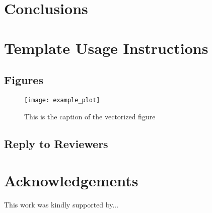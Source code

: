 \documentclass[journal]{IEEEtran}
\begin{document}
\section{Conclusions}
\label{sec_conclusions}

\section{Template Usage Instructions}
\subsection{Figures} \label{sec_figures}


\begin{figure}[t] %
     \centering
     \texttt{[image: example\_plot]}
     \caption{This is the caption of the vectorized figure}
     \label{fig_MyLabel}
  \end{figure}

\subsection{Reply to Reviewers}\label{sec_reply}


\section*{Acknowledgements}
This work was kindly supported by... 









\newpage
\vfill
\end{document}
